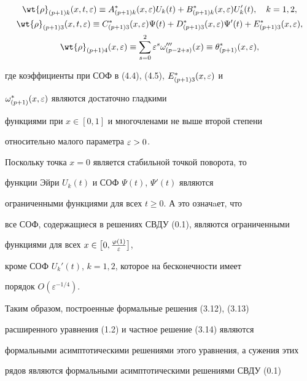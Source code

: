 \begin{gather}


{\wt{\rho}}_{(p+1)k} (x,t, \e) \equiv A_{(p+1)k} ^* (x, \e) U_k


(t) + B_{(p+1)k} ^* (x, \e) U_k ' (t), \quad k =1,2, \\


{\wt{\rho}}_{(p+1)3} (x,t, \e) \equiv C_{(p+1)3} ^* (x, \e) \Psi (t) +


D_{(p+1)3} ^* (x, \e)\Psi ' (t) + E_{(p+1)3} ^* (x, \e), \\


\wt{\rho}_{(p+1)4} (x, \e) \equiv


\sum_{s=0} ^2 \e^s {{\omega}}_{(p-2+s) } ''' (x) \equiv


{\theta}_{(p + 1) } ^* (x, \e),\notag


\end{gather}


где коэффициенты при СОФ в (4.4), (4.5), $E_{(p+1)3} ^* (x, \varepsilon)$ и


$ {\omega}_{(p + 1) } ^* (x, \varepsilon)$ являются достаточно гладкими


функциями при $x \in [0,1]$ и многочленами не выше второй степени


относительно малого параметра $\varepsilon > 0$.





Поскольку точка $x = 0$ является стабильной точкой поворота, то


функции Эйри $U_k (t)$ и СОФ $\Psi (t)$, $ \Psi' (t)$ являются


ограниченными функциями для всех $t \geq 0$. А это означaет, что


все СОФ, содержащиеся в решениях СВДУ (0.1), являются ограниченными


функциями для всех $x \in \bigl[ 0, \frac{\varphi(1)}{\varepsilon} \bigr]$,


кроме СОФ $U_k '(t)$, $k =1,2$, которое на бесконечности имеет


порядок $O(\varepsilon^{-1/4})$.





Таким образом, построенные формальные решения (3.12), (3.13)


расширенного уравнения (1.2) и частное решение (3.14) являются 


формальными асимптотическими решениями этого уравнения, а сужения этих


рядов являются формальными асимптотическими решениями СВДУ (0.1)


